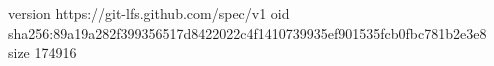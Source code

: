 version https://git-lfs.github.com/spec/v1
oid sha256:89a19a282f399356517d8422022c4f1410739935ef901535fcb0fbc781b2e3e8
size 174916

